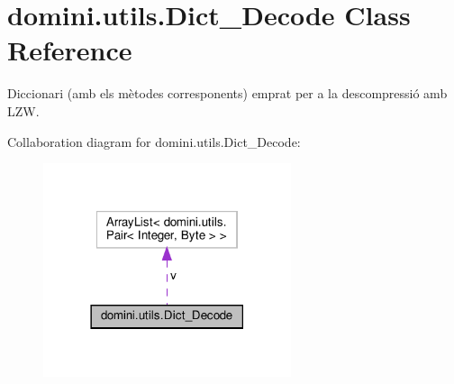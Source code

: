 \hypertarget{classdomini_1_1utils_1_1Dict__Decode}{}\section{domini.\+utils.\+Dict\+\_\+\+Decode Class Reference}
\label{classdomini_1_1utils_1_1Dict__Decode}


Diccionari (amb els mètodes corresponents) emprat per a la descompressió amb L\+ZW.  




Collaboration diagram for domini.\+utils.\+Dict\+\_\+\+Decode\+:
\nopagebreak
\begin{figure}[H]
\begin{center}
\leavevmode
\includegraphics[width=206pt]{classdomini_1_1utils_1_1Dict__Decode__coll__graph}
\end{center}
\end{figure}
